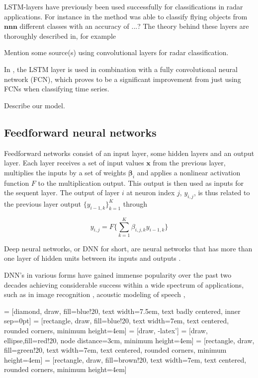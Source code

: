 LSTM-layers have previously been used successfully for classifications in radar applications. For instance in \citep{jithesh_sagayaraj_srinivasa_2018} the method was able to classify flying objects from $\textbf{nnn}$ different classes with an accuracy of ...? The theory behind these layers are thoroughly described in, for example \citep{hochreiter_schmidhuber_1997}

Mention some source(s) using convolutional layers for radar classification.

 In \citep{karim_majumdar_darabi_chen_2018}, the LSTM layer is used in combination with a fully convolutional neural network (FCN), which proves to be a significant improvement from just using FCNs when classifying time series.

Describe our model.

\subsection*{Feedforward neural networks}
Feedforward networks consist of an input layer, some hidden layers and an output layer. Each layer receives a set of input values $\mathbf{x}$ from the previous layer, multiplies the inputs by a set of weights $\mathbf{\beta}_{i}$ and applies a nonlinear activation function $F$ to the multiplication output. This output is then used as inputs for the sequent layer. The output of layer $i$ at neuron index $j$, $y_{i,j}$, is thus related to the previous layer output $\{{y}_{i-1, k}\}_{k=1}^{K}$ through

\begin{equation}
	y_{i,j} = F\Big\{\sum_{k=1}^{K}\beta_{i,j,k}y_{i-1,k}\Big\}
\end{equation}




Deep neural networks, or DNN for short, are neural networks that has more than one layer of hidden units between its inputs and outputs \citep{hinton_deng_yu_dahl_mohamed_jaitly_senior_vanhoucke_nguyen_sainath_2012}. 


DNN's in various forms have gained immense popularity over the past two decades achieving considerable success within a wide spectrum of applications, such as in image recognition \citep{szegedy_liu_jia_sermanet_reed_anguelov_erhan_vanhoucke_rabinovich_2018}, acoustic modeling of speech \citep{hinton_deng_yu_dahl_mohamed_jaitly_senior_vanhoucke_nguyen_sainath_2012}, 



 = [diamond, draw, fill=blue!20, 
    text width=7.5em, text badly centered, inner sep=0pt]
 = [rectangle, draw, fill=blue!20, 
    text width=7em, text centered, rounded corners, minimum height=4em]
 = [draw, -latex']
 = [draw, ellipse,fill=red!20, node distance=3cm,
    minimum height=4em]
 = [rectangle, draw, fill=green!20, 
    text width=7em, text centered, rounded corners, minimum height=4em]
 = [rectangle, draw, fill=brown!20, 
    text width=7em, text centered, rounded corners, minimum height=4em]

